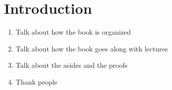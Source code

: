 \chapter{Introduction}

\begin{enumerate}
\item Talk about how the book is organized
\item Talk about how the book goes along with lectures
\item Talk about the asides and the proofs
\item Thank people
\end{enumerate}

